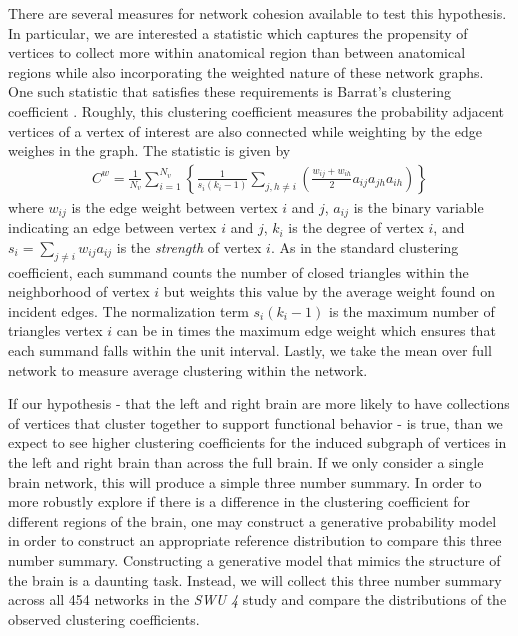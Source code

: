 \documentclass[01pt]{article}
\begin{document}
There are several measures for network cohesion available to test this hypothesis.
In particular, we are interested a statistic which captures the propensity of vertices to collect more within anatomical region than between anatomical regions while also incorporating the weighted nature of these network graphs. 
One such statistic that satisfies these requirements is Barrat's clustering coefficient \cite{Barrat2004}. 
Roughly, this clustering coefficient measures the probability adjacent vertices of a vertex of interest are also connected while weighting by the edge weighes in the graph. 
The statistic is given by 
\begin{align}
    C^{w} = \frac{1}{N_v}\sum_{i=1}^{N_v}\left\{\frac{1}{s_i(k_i - 1)}\sum_{j,h\neq i}\left(\frac{w_{ij}+w_{ih}}{2}a_{ij}a_{jh}a_{ih}\right)\right\}
\end{align}
where $w_{ij}$ is the edge weight between vertex $i$ and $j$, $a_{ij}$ is the binary variable indicating an edge between vertex $i$ and $j$, $k_i$ is the degree of vertex $i$, and $s_i = \sum_{j\neq i}w_{ij}a_{ij}$ is the \textit{strength} of vertex $i$. 
As in the standard clustering coefficient, each summand counts the number of closed triangles within the neighborhood of vertex $i$ but weights this value by the average weight found on incident edges. 
The normalization term $s_i(k_i-1)$ is the maximum number of triangles vertex $i$ can be in times the maximum edge weight which ensures that each summand falls within the unit interval. 
Lastly, we take the mean over full network to measure average clustering within the network. 

If our hypothesis - that the left and right brain are more likely to have collections of vertices that cluster together to support functional behavior - is true, than we expect to see higher clustering coefficients for the induced subgraph of vertices in the left and right brain than across the full brain. 
If we only consider a single brain network, this will produce a simple three number summary. 
In order to more robustly explore if there is a difference in the clustering coefficient for different regions of the brain, one may construct a generative probability model in order to construct an appropriate reference distribution to compare this three number summary. 
Constructing a generative model that mimics the structure of the brain is a daunting task. 
Instead, we will collect this three number summary across all 454 networks in the \textit{SWU 4} study and compare the distributions of the observed clustering coefficients. 
\end{document}
